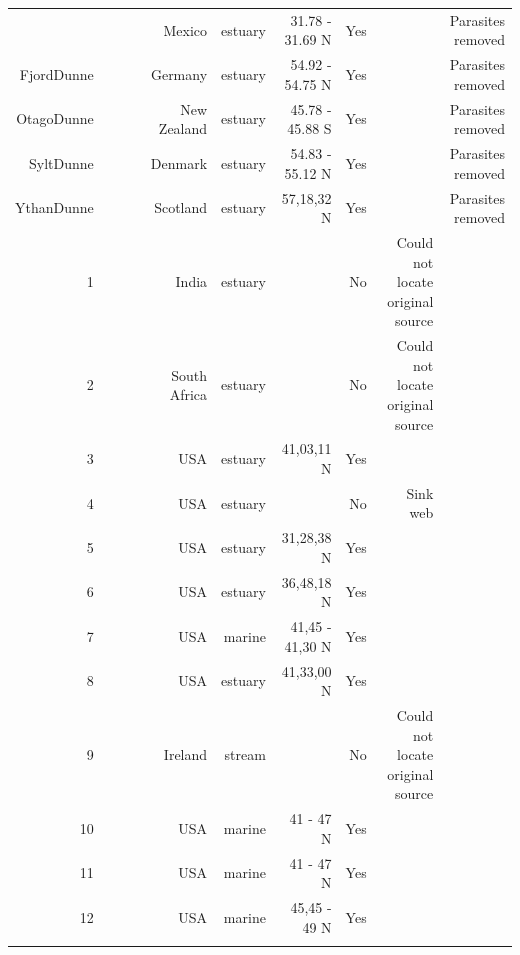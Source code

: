 \documentclass[12pt]{article}
\begin{document}
\begin{landscape}
\begin{table}[h!]
\begin{tabular}{rrrrrrrrr}
{      EsteroDunne & ~\citet{Dunne2013} & ~\citet{Hechinger2011} & Mexico & estuary & 31.78 - 31.69 N & Yes   &       & Parasites removed \\
      FjordDunne & ~\citet{Dunne2013} & ~\citet{Zander2011} & Germany & estuary & 54.92 - 54.75 N & Yes   &       & Parasites removed \\
      OtagoDunne & ~\citet{Dunne2013} & ~\citet{Mouritsen2011} & New Zealand & estuary & 45.78 - 45.88 S & Yes   &       & Parasites removed \\
      SyltDunne & ~\citet{Dunne2013} & ~\citet{Thieltges2011} & Denmark & estuary & 54.83 - 55.12 N & Yes   &       & Parasites removed \\
      YthanDunne & ~\citet{Dunne2013} & ~\citet{Huxham1996} & Scotland & estuary & 57,18,32 N & Yes   &       & Parasites removed \\
      1     & ~\citet{GlobalWeb} & ~\citet{Qazim1970} & India & estuary &       & No    & Could not locate original source &  \\
      2     & ~\citet{GlobalWeb} & ~\citet{Day1967} & South Africa & estuary &       & No    & Could not locate original source &  \\
      3     & ~\citet{GlobalWeb} & ~\citet{Woodwell1967} & USA   & estuary & 41,03,11 N & Yes   &       &  \\
      4     & ~\citet{GlobalWeb} & ~\citet{Johnston1956} & USA   & estuary &       & No    & Sink web &  \\
      5     & ~\citet{GlobalWeb} & ~\citet{Teal1962} & USA   & estuary & 31,28,38 N & Yes   &       &  \\
      6     & ~\citet{GlobalWeb} & ~\citet{MacGinitie1935} & USA   & estuary & 36,48,18 N & Yes   &       &  \\
      7     & ~\citet{GlobalWeb} & ~\citet{Kremer1978} & USA   & marine & 41,45 - 41,30 N & Yes   &       &  \\
      8     & ~\citet{GlobalWeb} & ~\citet{Nixon1973} & USA   & estuary & 41,33,00 N & Yes   &       &  \\
      9     & ~\citet{GlobalWeb} & ~\citet{Kitching1967} & Ireland & stream &       & No    & Could not locate original source &  \\
      10    & ~\citet{GlobalWeb} & ~\citet{Menge1976} & USA   & marine & 41 - 47 N & Yes   &       &  \\
      11    & ~\citet{GlobalWeb} & ~\citet{Menge1976} & USA   & marine & 41 - 47 N & Yes   &       &  \\
      12    & ~\citet{GlobalWeb} & ~\citet{Menge1976} & USA   & marine & 45,45 - 49 N & Yes   &       &  \\
}
\end{tabular}
\end{table}
\end{landscape}
\end{document}
